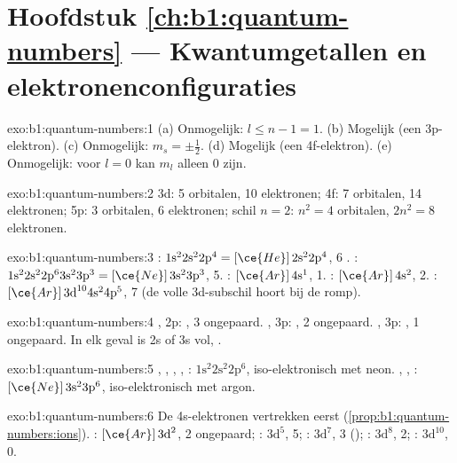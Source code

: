 \section*{Hoofdstuk \ref{ch:b1:quantum-numbers} --- Kwantumgetallen en elektronenconfiguraties}

\begin{solution}{exo:b1:quantum-numbers:1}
(a) Onmogelijk: $l \le n - 1 = 1$. (b) Mogelijk (een 3p-elektron).
(c) Onmogelijk: $m_s = \pm\tfrac12$. (d) Mogelijk (een 4f-elektron).
(e) Onmogelijk: voor $l = 0$ kan $m_l$ alleen 0 zijn.
\end{solution}

\begin{solution}{exo:b1:quantum-numbers:2}
3d: 5 orbitalen, 10 elektronen; 4f: 7 orbitalen, 14 elektronen; 5p: 3
orbitalen, 6 elektronen; schil $n = 2$: $n^2 = 4$ orbitalen, $2n^2 = 8$
elektronen.
\end{solution}

\begin{solution}{exo:b1:quantum-numbers:3}
: $1\text{s}^2 2\text{s}^2 2\text{p}^4 = [\ce{He}]\,2\text{s}^2 2\text{p}^4$,
6 . : $1\text{s}^2 2\text{s}^2 2\text{p}^6 3\text{s}^2
3\text{p}^3 = [\ce{Ne}]\,3\text{s}^2 3\text{p}^3$, 5. : $[\ce{Ar}]\,4\text{s}^1$,
1. : $[\ce{Ar}]\,4\text{s}^2$, 2. : $[\ce{Ar}]\,3\text{d}^{10}
4\text{s}^2 4\text{p}^5$, 7 (de volle 3d-subschil hoort bij de romp).
\end{solution}

\begin{solution}{exo:b1:quantum-numbers:4}
, 2p: , 3 ongepaard. , 3p: , 2
ongepaard. , 3p: , 1 ongepaard. In elk geval is 2s
of 3s vol, .
\end{solution}

\begin{solution}{exo:b1:quantum-numbers:5}
, , , , : $1\text{s}^2
2\text{s}^2 2\text{p}^6$, iso-elektronisch met neon. , ,
: $[\ce{Ne}]\,3\text{s}^2 3\text{p}^6$, iso-elektronisch met
argon.
\end{solution}

\begin{solution}{exo:b1:quantum-numbers:6}
De 4s-elektronen vertrekken eerst (\cref{prop:b1:quantum-numbers:ions}).
: $[\ce{Ar}]\,3\text{d}^2$, 2 ongepaard; :
$3\text{d}^5$, 5; : $3\text{d}^7$, 3 ();
: $3\text{d}^8$, 2; : $3\text{d}^{10}$, 0.
\end{solution}

